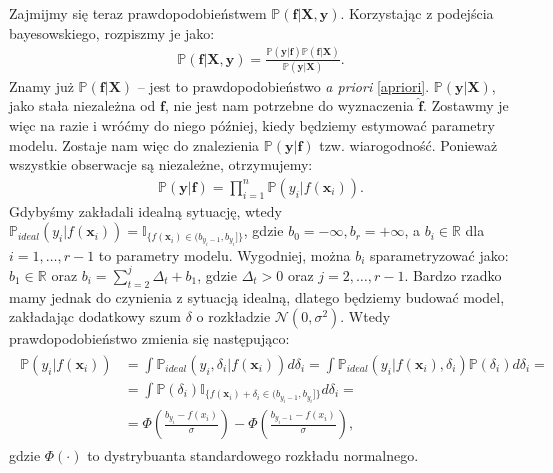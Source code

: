 \documentclass{mini}
\begin{document}
Zajmijmy się teraz prawdopodobieństwem $\mathbb{P}(\mathbf{f} | \textbf{X}, \textbf{y})$. Korzystając z podejścia bayesowskiego, rozpiszmy je jako:
\begin{align}\label{bayes}
\mathbb{P}(\mathbf{f} | \textbf{X}, \textbf{y}) 
=
\frac{
\mathbb{P}(\mathbf{y} | \textbf{f})
\mathbb{P}(\mathbf{f} | \textbf{X})
}{
\mathbb{P}(\mathbf{y} | \textbf{X})
}. 
\end{align}
Znamy już $\mathbb{P}(\mathbf{f} | \textbf{X})$ -- jest to prawdopodobieństwo \textit{a priori} \eqref{apriori}. $\mathbb{P}(\mathbf{y} | \textbf{X})$, jako stała niezależna od $\mathbf{f}$, nie jest nam potrzebne do wyznaczenia $\mathbf{\hat{f}}$. Zostawmy je więc na razie i wróćmy do niego później, kiedy będziemy estymować parametry modelu. Zostaje nam więc do znalezienia $\mathbb{P}(\mathbf{y} | \textbf{f})$ tzw. wiarogodność. Ponieważ wszystkie obserwacje są niezależne, otrzymujemy:
\begin{align}\label{prod}
\mathbb{P}(\mathbf{y} | \textbf{f}) 
=
\prod^n_{i=1}\mathbb{P}(y_i | f(\mathbf{x}_i)).
\end{align}
Gdybyśmy zakładali idealną sytuację, wtedy $\mathbb{P}_{ideal} (y_i|f(\mathbf{x}_i)) = \mathbb{I}_{\lbrace f(\mathbf{x}_i)\in (b_{y_i-1}, b_{y_i}] \rbrace}$, gdzie $b_0=-\infty, b_r=+\infty$, a $b_i\in\mathbb{R}$ dla $i=1, \ldots, r-1$ to parametry modelu. Wygodniej, można $b_i$ sparametryzować jako: $b_1\in\mathbb{R}$ oraz $b_i = \sum_{t=2}^j\Delta_t+b_1$, gdzie $\Delta_t>0$ oraz $j=2, \ldots, r-1$. Bardzo rzadko mamy jednak do czynienia z sytuacją idealną, dlatego będziemy budować model, zakładając dodatkowy szum $\delta$ o rozkładzie $\mathcal{N}(0, \sigma^2)$. Wtedy prawdopodobieństwo zmienia się następująco:
\begin{align}\label{dystryb}
\begin{split}
\mathbb{P}(y_i|f(\mathbf{x}_i)) 
&= 
\int \mathbb{P}_{ideal} (y_i,\delta_i | f(\mathbf{x}_i))d\delta_i
=
\int \mathbb{P}_{ideal} (y_i | f(\mathbf{x}_i),\delta_i)\mathbb{P}(\delta_i)  d\delta_i=\\
&=
\int \mathbb{P}(\delta_i)\mathbb{I}_{\lbrace f(\mathbf{x}_i)+\delta_i\in (b_{y_i-1}, b_{y_i}] \rbrace}  d\delta_i=\\
&=
\Phi\left(\frac{b_{y_i}-f(x_i)}{\sigma} \right) 
- 
\Phi\left( \frac{b_{y_i-1}-f(x_i)}{\sigma} \right),
\end{split}
\end{align}
gdzie $\Phi(\cdot)$ to dystrybuanta standardowego rozkładu normalnego.
\end{document}
